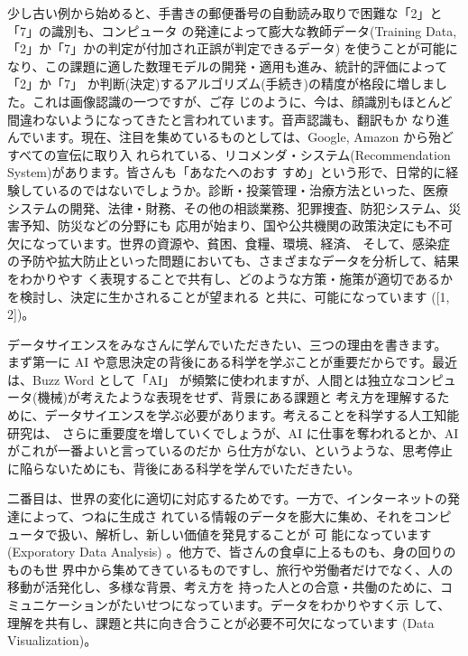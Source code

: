 \documentclass[
]{book}
\theoremstyle{definition}
\theoremstyle{definition}
\theoremstyle{definition}
\theoremstyle{definition}
\theoremstyle{remark}
\begin{document}
少し古い例から始めると、手書きの郵便番号の自動読み取りで困難な「2」と「7」の識別も、コンピュータ の発達によって膨大な教師データ(Training Data,「2」か「7」かの判定が付加され正誤が判定できるデータ) を使うことが可能になり、この課題に適した数理モデルの開発・適用も進み、統計的評価によって「2」か「7」 か判断(決定)するアルゴリズム(手続き)の精度が格段に増しました。これは画像認識の一つですが、ご存 じのように、今は、顔識別もほとんど間違わないようになってきたと言われています。音声認識も、翻訳もか なり進んでいます。現在、注目を集めているものとしては、Google, Amazon から殆どすべての宣伝に取り入 れられている、リコメンダ・システム(Recommendation System)があります。皆さんも「あなたへのおす すめ」という形で、日常的に経験しているのではないでしょうか。診断・投薬管理・治療方法といった、医療 システムの開発、法律・財務、その他の相談業務、犯罪捜査、防犯システム、災害予知、防災などの分野にも 応用が始まり、国や公共機関の政策決定にも不可欠になっています。世界の資源や、貧困、食糧、環境、経済、 そして、感染症の予防や拡大防止といった問題においても、さまざまなデータを分析して、結果をわかりやす く表現することで共有し、どのような方策・施策が適切であるかを検討し、決定に生かされることが望まれる と共に、可能になっています ({[}1, 2{]})。

データサイエンスをみなさんに学んでいただきたい、三つの理由を書きます。
まず第一に AI や意思決定の背後にある科学を学ぶことが重要だからです。最近は、Buzz Word として「AI」 が頻繁に使われますが、人間とは独立なコンピュータ(機械)が考えたような表現をせず、背景にある課題と 考え方を理解するために、データサイエンスを学ぶ必要があります。考えることを科学する人工知能研究は、 さらに重要度を増していくでしょうが、AI に仕事を奪われるとか、AI がこれが一番よいと言っているのだか ら仕方がない、というような、思考停止に陥らないためにも、背後にある科学を学んでいただきたい。

二番目は、世界の変化に適切に対応するためです。一方で、インターネットの発達によって、つねに生成さ れている情報のデータを膨大に集め、それをコンピュータで扱い、解析し、新しい価値を発見することが 可 能になっています (Exporatory Data Analysis) 。他方で、皆さんの食卓に上るものも、身の回りのものも世
界中から集めてきているものですし、旅行や労働者だけでなく、人の移動が活発化し、多様な背景、考え方を 持った人との合意・共働のために、コミュニケーションがたいせつになっています。データをわかりやすく示 して、理解を共有し、課題と共に向き合うことが必要不可欠になっています (Data Visualization)。
\end{document}
